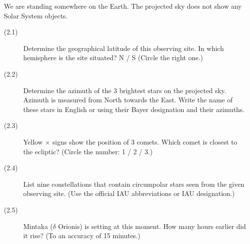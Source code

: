 We are standing somewhere on the Earth. The projected sky does not show any
Solar System objects.

\begin{description}
\item[(2.1)] Determine the geographical latitude of this observing site. In
  which hemisphere is the site situated? N / S (Circle the right one.)
\item[(2.2)] Determine the azimuth of the 3 brightest stars on the projected
  sky. Azimuth is measured from North towards the East. Write the name of
  these stars in English or using their Bayer designation and their
  azimuths.
\item[(2.3)] Yellow $\times$ signs show the position of 3 comets. Which
  comet is closest to the ecliptic? (Circle the number: 1 / 2 / 3.)
\item[(2.4)] List nine constellations that contain circumpolar stars seen
  from the given observing site. (Use the official IAU abbreviations or IAU
  designation.)
\item[(2.5)] Mintaka ($\delta$ Orionis) is setting at this moment. How many
  hours earlier did it rise? (To an accuracy of 15 minutes.)
\end{description}
